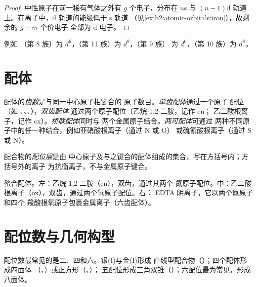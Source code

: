 \begin{proof}
中性原子在前一稀有气体之外有 $g$ 个电子，分布在 $n$s 与
$(n - 1)$d 轨道上。在离子中，d 轨道的能级低于 s 轨道
（见\cref{ex:b2:atomic-orbitals:iron}），故剩余的 $g - m$ 个价电子
全部为 d 电子。
\end{proof}

例如 （第 8 族）为 $d^6$，（第 11 族）为 $d^9$，（第 9 族）
为 $d^6$，（第 10 族）为 $d^8$。

\section{配体}

\begin{definition}[齿数]\label{def:b2:coordination-complexes:denticity}
配体的\emph{齿数}是与同一中心原子相键合的
原子数目。\emph{单齿配体}通过一个原子
配位（如 、、、），\emph{双齿配体}
通过两个原子配位（乙烷-1,2-二胺，记作 en；
乙二酸根离子，记作 ox）。\emph{桥联配体}同时与
两个金属原子结合。\emph{两可配体}可通过
两种不同原子中的任一种结合，例如亚硝酸根离子（通过 N 或 O）
或硫氰酸根离子（通过 S 或 N）。
\end{definition}

\begin{definition}[配位层]\label{def:b2:coordination-complexes:coordination-sphere}
配合物的\emph{配位层}是由
中心原子及与之键合的配体组成的集合，写在方括号内；方括号外的离子
为抗衡离子，不与金属原子键合。
\end{definition}

\begin{omfigure}
\qquad
{}
\qquad
{}

\medskip
{\small 螯合配体。左：乙烷-1,2-二胺（en），双齿，通过其两个
氮原子配位。中：乙二酸根离子（ox），双齿，通过两个氧原子配位。右：
EDTA 阴离子，它以两个氮原子和四个
羧酸根氧原子包裹金属离子（六齿配体）。}
\end{omfigure}

\section{配位数与几何构型}

配位数最常见的是二、四和六。银(I)与金(I)形成
直线型配合物（\ce{[Ag(NH3)2]+}）；四个配体形成四面体
（、）或正方形（、）；
五配位形成三角双锥（）；六配位最为常见，形成
八面体。

